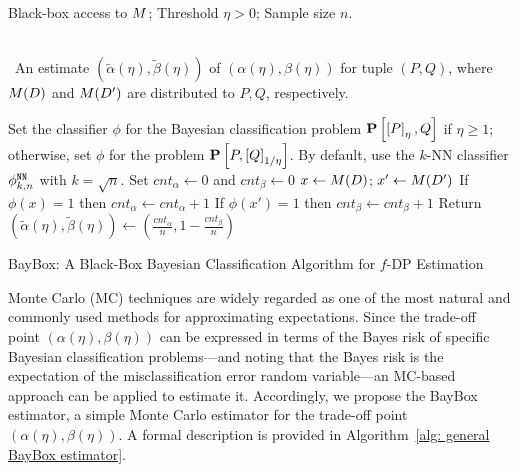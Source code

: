 \begin{algorithm}[!htp]
\footnotesize
\algorithmicrequire \; \parbox[t]{\dimexpr0.9\linewidth-\algorithmicindent}{Black-box access to $M$; Threshold $\eta > 0$; Sample size $n$.}\\[0.1cm]
\algorithmicensure \, An estimate $(\tilde{\alpha}(\eta), \tilde{\beta}(\eta))$ of $(\alpha(\eta), \beta(\eta))$ for tuple $(P, Q)$, where $M(D)$ and $M(D')$ are distributed to $P, Q$, respectively.
\begin{algorithmic}[1]
    \State Set the classifier $\phi$ for the Bayesian classification problem $\mathbf{P}\left[\left[P\right]_{\eta}, Q\right]$ if $\eta \geq 1$; otherwise, set $\phi$ for the problem $\mathbf{P}\left[P, \left[Q\right]_{1/\eta}\right]$. By default, use the $k$-NN classifier $\phi^{\mathtt{NN}}_{k, n}$ with $k = \sqrt{n}$.
    \State Set $cnt_{\alpha} \leftarrow 0$ and $cnt_{\beta} \leftarrow 0$
        \State $x \leftarrow M(D)$; $x' \leftarrow M(D')$
        \State If $\phi(x) = 1$ then $cnt_{\alpha} \leftarrow cnt_{\alpha} + 1$
        \State If $\phi(x') = 1$ then $cnt_{\beta} \leftarrow cnt_{\beta} + 1$
    \EndFor
    \State Return $(\tilde{\alpha}(\eta), \tilde{\beta}(\eta)) \leftarrow (\frac{cnt_{\alpha}}{n}, 1 - \frac{cnt_{\beta}}{n})$
    \EndFunction
\end{algorithmic}
\caption{BayBox: A Black-Box Bayesian Classification Algorithm for $f$-DP Estimation}
\label{alg: general BayBox estimator}
\end{algorithm}

Monte Carlo (MC) techniques are widely regarded as one of the most natural and commonly used methods for approximating expectations. Since the trade-off point $(\alpha(\eta), \beta(\eta))$ can be expressed in terms of the Bayes risk of specific Bayesian classification problems—and noting that the Bayes risk is the expectation of the misclassification error random variable—an MC-based approach can be applied to estimate it. Accordingly, we propose the BayBox estimator, a simple Monte Carlo estimator for the trade-off point $(\alpha(\eta), \beta(\eta))$. A formal description is provided in Algorithm~\ref{alg: general BayBox estimator}.




